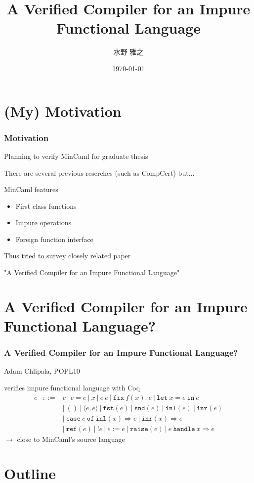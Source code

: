 \documentclass[dvipdfmx,cjk,xcolor=dvipsnames,envcountsect,notheorems,aspectratio=169]{beamer}
\title{A Verified Compiler for an Impure Functional Language}
\author{水野 雅之}
\date{\today}
\theoremstyle{definition}
\newcommand{\FIX}{\texttt{fix}}
\newcommand{\LET}{\texttt{let}}
\newcommand{\IN}{\texttt{in}}
\newcommand{\FST}{\texttt{fst}}
\newcommand{\SND}{\texttt{snd}}
\newcommand{\INL}{\texttt{inl}}
\newcommand{\INR}{\texttt{inr}}
\newcommand{\CASE}{\texttt{case}}
\newcommand{\OF}{\texttt{of}}
\newcommand{\REF}{\texttt{ref}}
\newcommand{\RAISE}{\texttt{raise}}
\newcommand{\HANDLE}{\texttt{handle}}
\begin{document}
\frame[plain]{\titlepage}

\section*{(My) Motivation}

\begin{frame}
  \frametitle{Motivation}
	\LARGE Planning to verify MinCaml for graduate thesis

	There are several previous reserches (such as CompCert) but...

	\vfill

	MinCaml features
	\begin{itemize}
		\item First class functions
		\item Impure operations
		\item Foreign function interface
	\end{itemize}
	
	\vfill

	Thus tried to survey closely related paper

	"A Verified Compiler for an Impure Functional Language"
\end{frame}

\section*{A Verified Compiler for an Impure Functional Language?}

\begin{frame}
  \frametitle{A Verified Compiler for an Impure Functional Language?}
	\LARGE Adam Chlipala, POPL10

	\vfill

	verifies impure functional language with Coq
	\[
		\begin{array}{lcl}
			e & ::= & c~|~e=e~|~x~|~e~e~|~\FIX~f(x).~e~|~\LET~x=e~\IN~e \\
				&     & |~()~|~\langle e,e\rangle~|~\FST(e)~|~\SND(e)~|~\INL(e)~|~\INR(e) \\
				&     & |~\CASE~e~\OF~\INL(x)\Rightarrow e~|~\INR(x)\Rightarrow e \\
				&     & |~\REF(e)~|~!e~|~e := e~|~\RAISE(e)~|~e~\HANDLE~x\Rightarrow e
		\end{array}
	\]
	$\rightarrow$ close to MinCaml's source language
\end{frame}

\section*{Outline}
\end{document}
